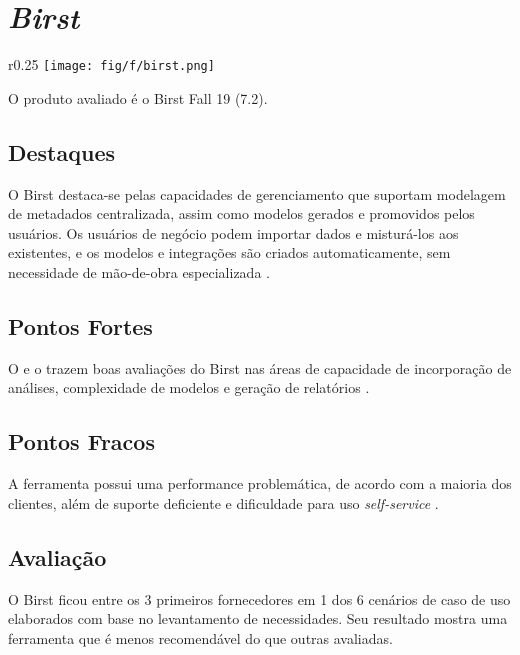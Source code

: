\section{\emph{Birst}}
\label{sub-birst}

\begin{wrapfigure}[3]{r}{0.25\textwidth}     
    \centering
    \texttt{[image: fig/f/birst.png]}
\end{wrapfigure}

O produto avaliado é o Birst Fall 19 (7.2).

\subsection*{Destaques}

O Birst destaca-se pelas capacidades de gerenciamento que suportam modelagem de metadados centralizada, assim como modelos gerados e promovidos pelos usuários. Os usuários de negócio podem importar dados e misturá-los aos existentes, e os modelos e integrações são criados automaticamente, sem necessidade de mão-de-obra especializada \cite{gartner:criticalcapabilities}.

\subsection*{Pontos Fortes}

O \relGMQ \xspace e o \relGCC \xspace trazem boas avaliações do Birst nas áreas de capacidade de incorporação de análises, complexidade de modelos e geração de relatórios \cite{gartner:criticalcapabilities}.

\subsection*{Pontos Fracos}

A ferramenta possui uma performance problemática, de acordo com a maioria dos clientes, além de suporte deficiente e dificuldade para uso \emph{self-service} \cite{gartner:magicquadrant}.

\subsection*{Avaliação}

O Birst ficou entre os 3 primeiros fornecedores em 1 dos 6 cenários de caso de uso elaborados com base no levantamento de necessidades. Seu resultado mostra uma ferramenta que é menos recomendável do que outras avaliadas.


